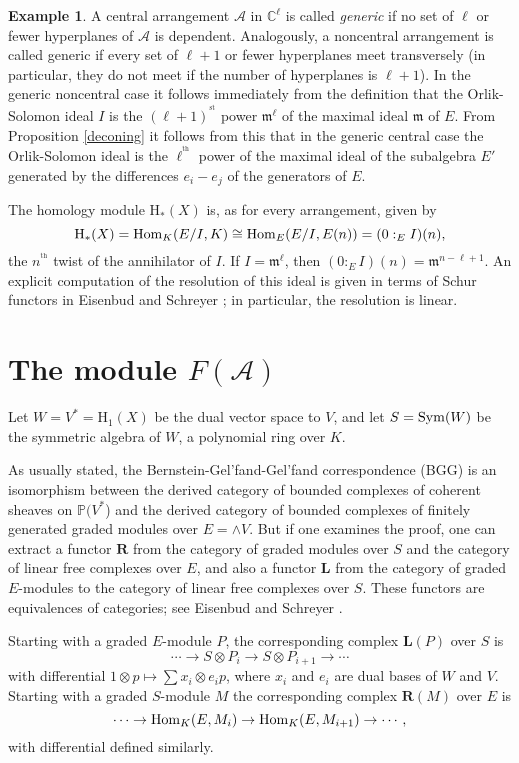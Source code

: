 \documentclass{tran-l}
\theoremstyle{definition}
\newtheorem{example}[theorem]{Example}
\theoremstyle{remark}
\newcommand{\thh}{{^{\mathrm {th}}}}
\newcommand{\st}{{^{\mathrm {st}}}}
\newcommand{\CC}{{\mathbb{C}}}
\newcommand{\PP}{{\mathbb{P}}}
\newcommand{\Acal}{{{\mathcal A}}}
\newcommand{\LL}{{\mathbf{L}}}
\newcommand{\RR}{{\mathbf{R}}}
\newcommand{\gm}{{\mathfrak m}}
\newcommand{\Hom}{\mathop{\rm Hom}\nolimits}
\newcommand{\rH}{{\mathrm H}}
\newcommand{\Sym}{\mathop{\rm Sym}\nolimits}
\begin{document}
\begin{example}\label{genericexample}
A central arrangement $\Acal$ 
in $\CC^\ell$ is called {\it generic\/}
if no set of $\ell$ or fewer hyperplanes of $\Acal$ is dependent.
Analogously, a noncentral arrangement is called generic 
if every set of $\ell+1$ or fewer hyperplanes meet transversely
(in particular, they do  not meet if the number of hyperplanes
is $\ell+1$). 
In the generic noncentral case it follows immediately
from the definition that the Orlik-Solomon ideal $I$ is the 
$(\ell+1)^\st$ power $\gm^\ell$ of the maximal ideal $\gm$
of $E$. From Proposition \ref{deconing} it follows from this that in the 
generic central case the
Orlik-Solomon ideal is the $\ell^\thh$ power of the maximal ideal of the
subalgebra $E'$ generated by the differences $e_i-e_j$ of the
generators of $E$.\end{example}

The homology module $\rH_*(X)$
is, as for every arrangement, given by
\[
\rH_*(X)=\Hom_K(E/I, K)\cong \Hom_E(E/I,E(n))=(0:_EI)(n),
\]
the $n^\thh$ twist of the annihilator of $I$.
If $I=\gm^\ell$, then $(0:_EI)(n)=\gm^{n-\ell+1}$.
An explicit computation of the resolution of this ideal is given in
terms of Schur functors in  Eisenbud and Schreyer \cite[Corollary 5.3]{ES}; 
in particular, the resolution is linear.


\section{The module $F(\mathcal{A})$}\label{S-module} 

Let $W=V^*=\rH_1(X)$ be the dual vector space to $V$, and let $S=\Sym(W)$
be the symmetric algebra of $W$, a polynomial ring over $ K$.

As usually stated, the Bernstein-Gel'fand-Gel'fand 
correspondence (BGG) is an isomorphism between the derived category
of bounded complexes of coherent sheaves on ${\PP}(V^*$) and the
derived category of bounded complexes of finitely generated graded
modules over $E=\wedge V$.  But if one examines the proof, one can
extract a functor ${\RR}$ from the category of graded modules
over $S$ and the category of linear
free complexes over $E$, and also a functor $\LL$
from the category of graded $E$-modules to the category
of linear free complexes over $S$. These functors are equivalences of
categories; see Eisenbud and Schreyer \cite[Proposition 2.1]{ES}.

Starting with a graded $E$-module $P$, the corresponding complex $\LL(P)$
over $S$ is
\[
\cdots \to S\otimes P_i\to S\otimes P_{i+1} \to \cdots
\]
with differential $1\otimes p\mapsto\sum x_i\otimes e_ip$, where
$x_i$ and $e_i$ are dual bases of $W$ and $V$. Starting with
a graded $S$-module $M$ the corresponding complex $\RR(M)$ over $E$ is
\[
\cdots \to \Hom_K(E, M_i)\to \Hom_K(E, M_{i+1})\to \cdots ,
\]
with differential defined similarly.
\end{document}
